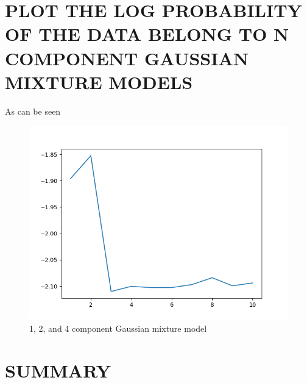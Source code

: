 \documentclass{article}
\begin{document}
\section{\MakeUppercase{Plot the log probability of the data belong to n component Gaussian mixture models}}
As can be seen
\begin{figure}[!htb]
	\centering
	\begin{minipage}{0.49\textwidth}
			\centering
			\includegraphics[width=1\linewidth]{../q1to6pics/q4.png}
			\caption{1, 2, and 4 component Gaussian mixture model}
	\end{minipage}\hfill
\end{figure}
\section{\MakeUppercase{Summary}}
\end{document}
